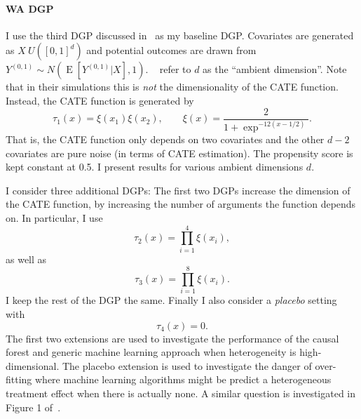 \documentclass[11pt, a4paper, leqno]{article}
\DeclareMathOperator{\E}{E}
\begin{document}
\paragraph*{WA DGP}
I use the third DGP discussed in~\cite{wager2018estimation} as my baseline DGP\@.
Covariates are generated as $X~U([0, 1]^d)$ and potential outcomes are drawn from $Y^{(0,1)} \sim N(\E[Y^{(0,1)}|X], 1)$.
~\cite{wager2018estimation} refer to $d$ as the ``ambient dimension''. Note that in their simulations this is \textit{not} the dimensionality of the CATE function.
Instead, the CATE function is generated by
\begin{equation*}
    \tau_1(x) = \xi(x_1)\xi(x_2), \qquad \xi(x) = \frac{2}{1 + \exp^{-12(x-1/2)}}.
\end{equation*}
That is, the CATE function only depends on two covariates and the other $d-2$ covariates are pure noise (in terms of CATE estimation).
The propensity score is kept constant at 0.5. I present results for various ambient dimensions $d$.

I consider three additional DGPs: The first two DGPs increase the dimension of the CATE function, by increasing the number of arguments the function depends on.
In particular, I use
\begin{equation*}
    \tau_2(x) = \prod_{i=1}^{4}\xi(x_i),
\end{equation*}
as well as
\begin{equation*}
    \tau_3(x) = \prod_{i=1}^{8}\xi(x_i).
\end{equation*}
I keep the rest of the DGP the same. Finally I also consider a \textit{placebo} setting with
\begin{equation*}
    \tau_4(x) = 0.
\end{equation*}
The first two extensions are used to investigate the performance of the causal forest and generic machine learning approach when heterogeneity is high-dimensional.
The placebo extension is used to investigate the danger of over-fitting where machine learning algorithms might be predict a heterogeneous treatment effect when there is actually none.
A similar question is investigated in Figure 1 of~\cite{chernozhukov2023genml}.
\end{document}
